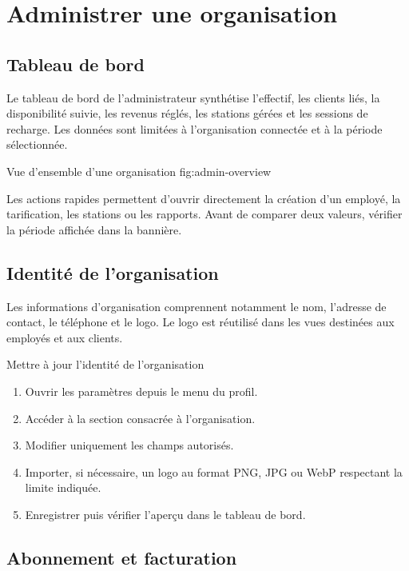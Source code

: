 \chapter{Administrer une organisation}

\section{Tableau de bord}

Le tableau de bord de l'administrateur synthétise l'effectif, les clients liés,
la disponibilité suivie, les revenus réglés, les stations gérées et les
sessions de recharge. Les données sont limitées à l'organisation connectée et
à la période sélectionnée.

  {Vue d'ensemble d'une organisation}
  {fig:admin-overview}

Les actions rapides permettent d'ouvrir directement la création d'un employé,
la tarification, les stations ou les rapports. Avant de comparer deux valeurs,
vérifier la période affichée dans la bannière.

\section{Identité de l'organisation}

Les informations d'organisation comprennent notamment le nom, l'adresse de
contact, le téléphone et le logo. Le logo est réutilisé dans les vues destinées
aux employés et aux clients.

\begin{procedurebox}{Mettre à jour l'identité de l'organisation}
  \begin{enumerate}[leftmargin=*]
    \item Ouvrir les paramètres depuis le menu du profil.
    \item Accéder à la section consacrée à l'organisation.
    \item Modifier uniquement les champs autorisés.
    \item Importer, si nécessaire, un logo au format PNG, JPG ou WebP respectant
    la limite indiquée.
    \item Enregistrer puis vérifier l'aperçu dans le tableau de bord.
  \end{enumerate}
\end{procedurebox}

\section{Abonnement et facturation}

